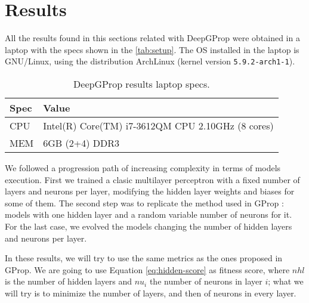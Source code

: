 \documentclass[runningheads]{llncs}
\begin{document}
\section{Results}
\label{sec:res}


All the results found in this sections related with DeepGProp 
\cite{deep-g-prop:anon} were obtained in a laptop with the specs shown in the
\autoref{tab:setup}. The OS installed in the laptop is GNU/Linux, using the
distribution ArchLinux (kernel version \texttt{5.9.2-arch1-1}).

\begin{table}[]
  \centering
  \caption{DeepGProp results laptop specs.}
  \label{tab:setup}
  \begin{tabular}{|l|l|}
  \hline
    Spec & Value                                             \\ \hline
    CPU  & Intel(R) Core(TM) i7-3612QM CPU 2.10GHz (8 cores) \\ \hline
    MEM  & 6GB (2+4) DDR3                                    \\ \hline
  \end{tabular}
\end{table}

We followed a progression path of increasing complexity in terms of models
execution. First we trained a clasic multilayer perceptron with a fixed number
of layers and neurons per layer, modifying the hidden layer weights and biases
for some of them. The second step was to replicate the method used in GProp
\cite{castilloNC,CastilloNPL}: models with one hidden layer and a random
variable number of neurons for it. For the last case, we evolved the models
changing the number of hidden layers and neurons per layer.

In these results, we will try to use the same metrics as the ones
proposed in GProp. We are going to use Equation
\ref{eq:hidden-score} as fitness score, where $nhl$ is the number of
hidden layers and $nu_{i}$ the number of neurons in layer $i$; what we
will try is to minimize the number of layers, and then of neurons in
every layer.

\end{document}
